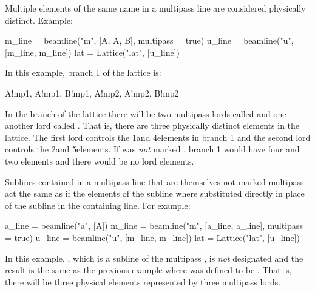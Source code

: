 Multiple elements of the same name in a multipass line are considered 
physically distinct. Example:
\begin{example}
  m_line = beamline("m", [A, A, B], multipass = true)
  u_line = beamline("u", [m_line, m_line])
  lat = Lattice("lat", [u_line])
\end{example}
In this example, branch 1 of the lattice is:
\begin{example}
  A!mp1, A!mp1, B!mp1, A!mp2, A!mp2, B!mp2
\end{example}
In the  branch of the lattice there will be two multipass lords called  and 
one another lord called . 
That is, there are three physically distinct elements in the lattice. The first
 lord controls the 1\St and 4\Th elements in branch 1 and the second
 lord controls the 2\Nd and 5\Th elements. If  was {\em not} marked ,
branch 1 would have four  and two  elements and there would be
no lord elements.

Sublines contained in a multipass line that are themselves not marked multipass act the same as if
the elements of the subline where substituted directly in place of the subline in the containing
line. For example:
\begin{example}
  a_line = beamline("a", [A])
  m_line = beamline("m", [a_line, a_line], multipass = true)
  u_line = beamline("u", [m_line, m_line])
  lat = Lattice("lat", [u_line])
\end{example}
In this example, , which is a subline of the multipass , is {\em not}
designated  and the result is the same as the previous example where  was
defined to be . That is, there will be three physical elements represented by three
multipass lords.

